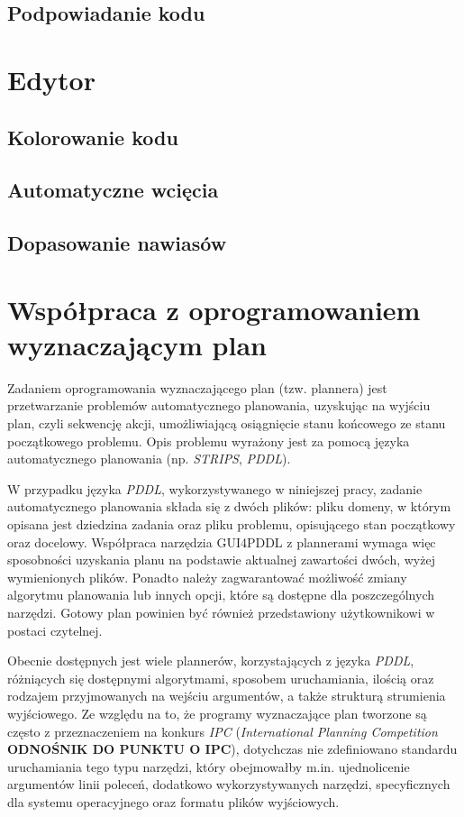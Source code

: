 \subsection{Podpowiadanie kodu}


\section{Edytor}
\subsection{Kolorowanie kodu}
\subsection{Automatyczne wcięcia}
\subsection{Dopasowanie nawiasów}
\section{Współpraca z oprogramowaniem wyznaczającym plan}
\label{sec:wspolpraca}
Zadaniem oprogramowania wyznaczającego plan (tzw. plannera) jest przetwarzanie problemów automatycznego planowania, uzyskując na wyjściu plan, czyli sekwencję akcji, umożliwiającą osiągnięcie stanu końcowego ze stanu początkowego problemu. Opis problemu wyrażony jest za pomocą języka automatycznego planowania (np. \textit{STRIPS}, \textit{PDDL}). 

W przypadku języka \textit{PDDL}, wykorzystywanego w niniejszej pracy, zadanie automatycznego planowania składa się z dwóch plików: pliku domeny, w którym opisana jest dziedzina zadania oraz pliku problemu, opisującego stan początkowy oraz docelowy. Współpraca narzędzia GUI4PDDL z plannerami wymaga więc sposobności uzyskania planu na podstawie aktualnej zawartości dwóch, wyżej wymienionych plików. Ponadto należy zagwarantować możliwość zmiany algorytmu planowania lub innych opcji, które są dostępne dla poszczególnych narzędzi. Gotowy plan powinien być również przedstawiony użytkownikowi w postaci czytelnej.

Obecnie dostępnych jest wiele plannerów, korzystających z języka \textit{PDDL}, różniących się dostępnymi algorytmami, sposobem uruchamiania, ilością oraz rodzajem przyjmowanych na wejściu argumentów, a także strukturą strumienia wyjściowego. Ze względu na to, że programy wyznaczające plan tworzone są często z przeznaczeniem na konkurs \textit{IPC} (\textit{International Planning Competition} \textbf{ODNOŚNIK DO PUNKTU O IPC}), dotychczas nie zdefiniowano standardu uruchamiania tego typu narzędzi, który obejmowałby m.in. ujednolicenie argumentów linii poleceń, dodatkowo wykorzystywanych narzędzi, specyficznych dla systemu operacyjnego oraz formatu plików wyjściowych.

